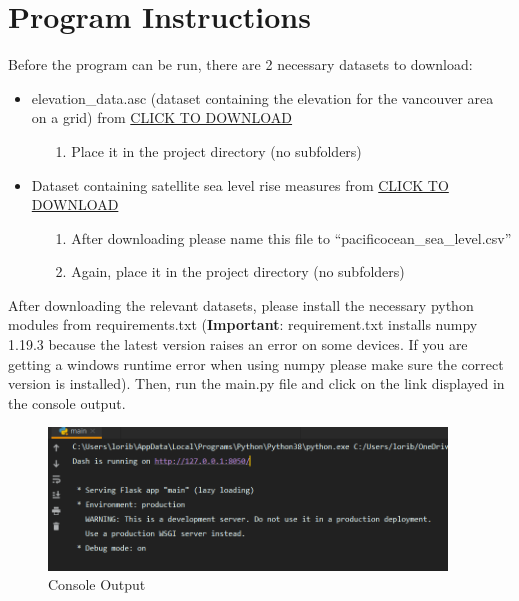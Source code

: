 \documentclass[fontsize=11pt]{article}
\begin{document}
    \section*{Program Instructions}
    Before the program can be run, there are 2 necessary datasets to download:
    \begin{itemize}
        \item elevation\_data.asc (dataset containing the elevation for the vancouver area on a grid) from
        \href{https://drive.google.com/file/d/1WTpvDGTbbd-y1P-TbWe_gyFAXLlJWBnU/view?usp=sharing}{CLICK TO DOWNLOAD}
        \begin{itemize}
            \item[1.] Place it in the project directory (no subfolders)
        \end{itemize}
        \item Dataset containing satellite sea level rise measures from
        \href{https://www.star.nesdis.noaa.gov/socd/lsa/SeaLevelRise/slr/slr_sla_np_keep_txj1j2.csv}{CLICK TO DOWNLOAD}
        \begin{itemize}
            \item[1.] After downloading please name this file to “pacificocean\_sea\_level.csv”
            \item[2.] Again, place it in the project directory (no subfolders)
        \end{itemize}
    \end{itemize}

    After downloading the relevant datasets, please install the necessary python modules from requirements.txt (\textbf{Important}: requirement.txt installs numpy 1.19.3 because the latest version raises an error on some devices. If you are getting a windows runtime error when using numpy please make sure the correct version is installed).
    Then, run the main.py file and click on the link displayed in the console output. \\
    \begin{figure}[h]
        \centering
        \includegraphics[width=300pt]{console.png}
        \caption{Console Output}
    \end{figure}
\end{document}
